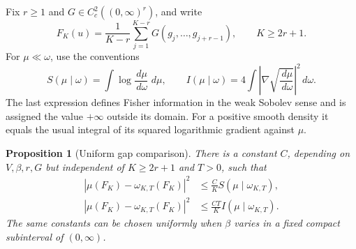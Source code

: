 \documentclass[11pt,reqno]{amsart}
\numberwithin{equation}{section}
\newtheorem{proposition}[theorem]{Proposition}
\theoremstyle{definition}
\newcommand{\1}{\mathbf 1}
\newcommand{\dd}{\,d}
\begin{document}
Fix $r\ge1$ and $G\in C_c^2((0,\infty)^r)$, and write
\begin{equation}\label{sta:observable}
F_K(u)=\frac1{K-r}\sum_{j=1}^{K-r}
 G(g_j,\ldots,g_{j+r-1}),\qquad K\ge2r+1.
\end{equation}
For $\mu\ll\omega$, use the conventions
\[
S(\mu\mid\omega)=\int\log\frac{\dd\mu}{\dd\omega}\,\dd\mu,
\qquad
I(\mu\mid\omega)=4\int
 \left|\nabla\sqrt{\frac{\dd\mu}{\dd\omega}}\right|^2\dd\omega.
\]
The last expression defines Fisher information in the weak Sobolev
sense and is assigned the value $+\infty$ outside its domain. For a
positive smooth density it equals the usual integral of its squared
logarithmic gradient against $\mu$.

\begin{proposition}[Uniform gap comparison]\label{sta:prop-gap}
There is a constant $C$, depending on $V,\beta,r,G$ but independent of
$K\ge2r+1$ and $T>0$, such that
\begin{align}
|\mu(F_K)-\omega_{K,T}(F_K)|^2
 &\le \frac{C}{K}S(\mu\mid\omega_{K,T}),
 \label{sta:entropy-gap}\\
|\mu(F_K)-\omega_{K,T}(F_K)|^2
 &\le \frac{CT}{K}I(\mu\mid\omega_{K,T}).
 \label{sta:fisher-gap}
\end{align}
The same constants can be chosen uniformly when $\beta$ varies in a
fixed compact subinterval of $(0,\infty)$.
\end{proposition}
\end{document}
